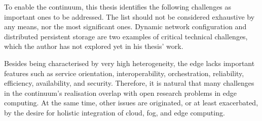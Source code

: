 To enable the continuum, this thesis identifies the following challenges as important ones to be addressed. The list should not be considered exhaustive by any means, nor the most significant ones. Dynamic network configuration and distributed persistent storage are two examples of critical technical challenges, which the author has not explored yet in his thesis' work.

Besides being characterised by very high heterogeneity, the edge lacks important features such as service orientation, interoperability, orchestration, reliability, efficiency, availability, and security. Therefore, it is natural that many challenges in the continuum's realisation overlap with open research problems in edge computing. At the same time, other issues are originated, or at least exacerbated, by the desire for holistic integration of cloud, fog, and edge computing.

